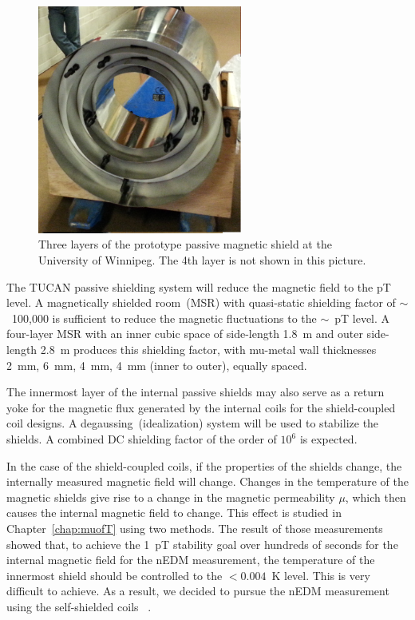 \begin{figure}[h!]
  \centering
  \includegraphics[width=0.6\textwidth]{prototype_shields.png}
  \caption[TUCAN's prototype passive shielding]{Three layers of the
    prototype passive magnetic shield at the University of
    Winnipeg. The 4th layer is not shown in this picture.}
  \label{fig:prototype_shields}
\end{figure}
The TUCAN passive shielding system will reduce the magnetic field to
the pT level.
A magnetically shielded room~(MSR) with quasi-static
shielding factor of $\sim$~100,000 is sufficient to reduce the magnetic
fluctuations to the $\sim$~pT level. A four-layer MSR with an inner
cubic space of side-length 1.8~m and outer side-length 2.8~m produces
this shielding factor, with mu-metal wall thicknesses 2~mm, 6~mm,
4~mm, 4~mm (inner to outer), equally spaced.


The innermost layer of the internal passive shields may also serve as
a return yoke for the magnetic flux generated by the internal coils
for the shield-coupled coil designs. A degaussing~(idealization)
system will be used to stabilize the shields. A combined DC shielding
factor of the order of $10^6$ is expected.


In the case of the shield-coupled coils, if the properties of the
shields change, the internally measured magnetic field will change.
Changes in the temperature of the magnetic shields give rise to a
change in the magnetic permeability $\mu$, which then causes the
internal magnetic field to change. This effect is studied in
Chapter~\ref{chap:muofT} using two methods. The result of those
measurements showed that, to achieve the 1~pT stability goal over
hundreds of seconds for the internal magnetic field for the nEDM
measurement, the temperature of the innermost shield should be
controlled to the $<0.004$~K level. This is very difficult to
achieve. As a result, we decided to pursue the nEDM measurement using
the self-shielded coils
~\cite{Rosie_thesis}.


